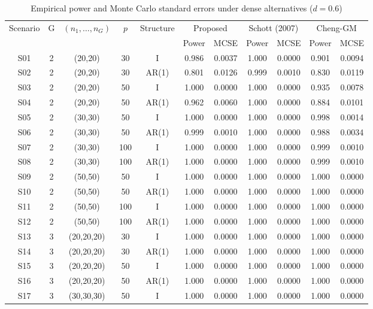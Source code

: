 \begin{table}[ht]
\centering
\caption{Empirical power and Monte Carlo standard errors under dense alternatives ($d = 0.6$)}
\label{tab:power_d60}
\scriptsize
\begin{tabular}{ccccccccccc}
\hline
Scenario & G & $(n_1,\ldots,n_G)$ & $p$ & Structure & \multicolumn{2}{c}{Proposed} & \multicolumn{2}{c}{Schott (2007)} & \multicolumn{2}{c}{Cheng-GM} \\
 & & & & & Power & MCSE & Power & MCSE & Power & MCSE \\
\hline
S01 & 2 & (20,20) & 30 & I & 0.986 & 0.0037 & 1.000 & 0.0000 & 0.901 & 0.0094 \\
S02 & 2 & (20,20) & 30 & AR(1) & 0.801 & 0.0126 & 0.999 & 0.0010 & 0.830 & 0.0119 \\
S03 & 2 & (20,20) & 50 & I & 1.000 & 0.0000 & 1.000 & 0.0000 & 0.935 & 0.0078 \\
S04 & 2 & (20,20) & 50 & AR(1) & 0.962 & 0.0060 & 1.000 & 0.0000 & 0.884 & 0.0101 \\
S05 & 2 & (30,30) & 50 & I & 1.000 & 0.0000 & 1.000 & 0.0000 & 0.998 & 0.0014 \\
S06 & 2 & (30,30) & 50 & AR(1) & 0.999 & 0.0010 & 1.000 & 0.0000 & 0.988 & 0.0034 \\
S07 & 2 & (30,30) & 100 & I & 1.000 & 0.0000 & 1.000 & 0.0000 & 0.999 & 0.0010 \\
S08 & 2 & (30,30) & 100 & AR(1) & 1.000 & 0.0000 & 1.000 & 0.0000 & 0.999 & 0.0010 \\
S09 & 2 & (50,50) & 50 & I & 1.000 & 0.0000 & 1.000 & 0.0000 & 1.000 & 0.0000 \\
S10 & 2 & (50,50) & 50 & AR(1) & 1.000 & 0.0000 & 1.000 & 0.0000 & 1.000 & 0.0000 \\
S11 & 2 & (50,50) & 100 & I & 1.000 & 0.0000 & 1.000 & 0.0000 & 1.000 & 0.0000 \\
S12 & 2 & (50,50) & 100 & AR(1) & 1.000 & 0.0000 & 1.000 & 0.0000 & 1.000 & 0.0000 \\
S13 & 3 & (20,20,20) & 30 & I & 1.000 & 0.0000 & 1.000 & 0.0000 & 1.000 & 0.0000 \\
S14 & 3 & (20,20,20) & 30 & AR(1) & 1.000 & 0.0000 & 1.000 & 0.0000 & 1.000 & 0.0000 \\
S15 & 3 & (20,20,20) & 50 & I & 1.000 & 0.0000 & 1.000 & 0.0000 & 1.000 & 0.0000 \\
S16 & 3 & (20,20,20) & 50 & AR(1) & 1.000 & 0.0000 & 1.000 & 0.0000 & 1.000 & 0.0000 \\
S17 & 3 & (30,30,30) & 50 & I & 1.000 & 0.0000 & 1.000 & 0.0000 & 1.000 & 0.0000 \\

\end{tabular}
\end{table}
